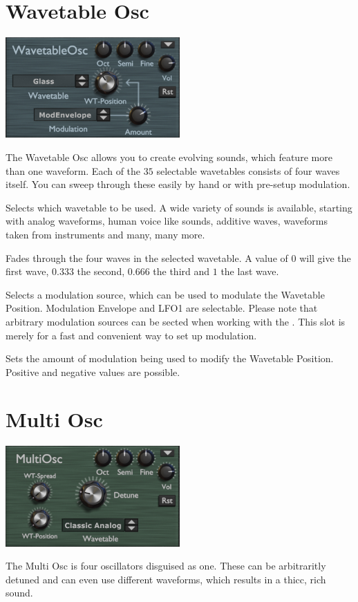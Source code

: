 \section{Wavetable Osc}
\begin{center}
    \includegraphics[width=0.5\textwidth]{graphics/wavetable_osc.png}
\end{center}
The Wavetable Osc allows you to create evolving sounds, which feature more than one waveform. Each of the $35$ selectable wavetables consists of four waves itself. You can sweep through these easily by hand or with pre-setup modulation.

{Selects which wavetable to be used. A wide variety of sounds is available, starting with analog waveforms, human voice like sounds, additive waves, waveforms taken from instruments and many, many more.}

{Fades through the four waves in the selected wavetable. A value of $0$ will give the first wave, $0.333$ the second, $0.666$ the third and $1$ the last wave.}

{Selects a modulation source, which can be used to modulate the Wavetable Position. Modulation Envelope and LFO1 are selectable. Please note that arbitrary modulation sources can be sected when working with the \modmatrix. This slot is merely for a fast and convenient way to set up modulation.}

{Sets the amount of modulation being used to modify the Wavetable Position. Positive and negative values are possible.}

\section{Multi Osc}
\begin{center}
    \includegraphics[width=0.5\textwidth]{graphics/multi_osc.png}
\end{center}
The Multi Osc is four oscillators disguised as one. These can be arbitraritly detuned and can even use different waveforms, which results in a thicc, rich sound.

